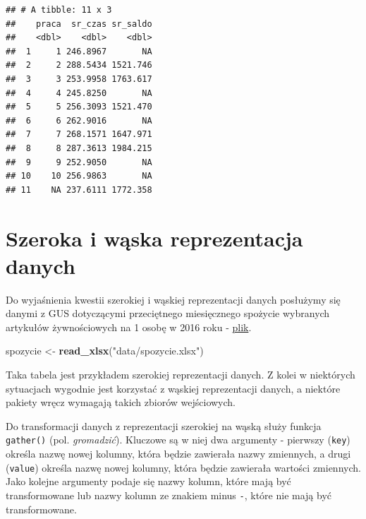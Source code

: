 \documentclass[]{book}
\newenvironment{Shaded}{\begin{snugshade}}{\end{snugshade}}
\newcommand{\KeywordTok}[1]{\textcolor[rgb]{0.13,0.29,0.53}{\textbf{#1}}}
\newcommand{\StringTok}[1]{\textcolor[rgb]{0.31,0.60,0.02}{#1}}
\newcommand{\CommentTok}[1]{\textcolor[rgb]{0.56,0.35,0.01}{\textit{#1}}}
\newcommand{\OperatorTok}[1]{\textcolor[rgb]{0.81,0.36,0.00}{\textbf{#1}}}
\newcommand{\NormalTok}[1]{#1}
\begin{document}
\begin{verbatim}
## # A tibble: 11 x 3
##    praca  sr_czas sr_saldo
##    <dbl>    <dbl>    <dbl>
##  1     1 246.8967       NA
##  2     2 288.5434 1521.746
##  3     3 253.9958 1763.617
##  4     4 245.8250       NA
##  5     5 256.3093 1521.470
##  6     6 262.9016       NA
##  7     7 268.1571 1647.971
##  8     8 287.3613 1984.215
##  9     9 252.9050       NA
## 10    10 256.9863       NA
## 11    NA 237.6111 1772.358
\end{verbatim}

\section{Szeroka i wąska reprezentacja
danych}\label{szeroka-i-waska-reprezentacja-danych}

Do wyjaśnienia kwestii szerokiej i wąskiej reprezentacji danych
posłużymy się danymi z GUS dotyczącymi przeciętnego miesięcznego
spożycie wybranych artykułów żywnościowych na 1 osobę w 2016 roku -
\href{data/spozycie.xlsx}{plik}.

\begin{Shaded}
\begin{Highlighting}[]
\NormalTok{spozycie <-}\StringTok{ }\KeywordTok{read_xlsx}\NormalTok{(}\StringTok{"data/spozycie.xlsx"}\NormalTok{)}
\end{Highlighting}
\end{Shaded}

Taka tabela jest przykładem szerokiej reprezentacji danych. Z kolei w
niektórych sytuacjach wygodnie jest korzystać z wąskiej reprezentacji
danych, a niektóre pakiety wręcz wymagają takich zbiorów wejściowych.

Do transformacji danych z reprezentacji szerokiej na wąską służy funkcja
\texttt{gather()} (pol. \emph{gromadzić}). Kluczowe są w niej dwa
argumenty - pierwszy (\texttt{key}) określa nazwę nowej kolumny, która
będzie zawierała nazwy zmiennych, a drugi (\texttt{value}) określa nazwę
nowej kolumny, która będzie zawierała wartości zmiennych. Jako kolejne
argumenty podaje się nazwy kolumn, które mają być transformowane lub
nazwy kolumn ze znakiem minus \texttt{-}, które nie mają być
transformowane.

\begin{Shaded}
\end{Shaded}
\end{document}
